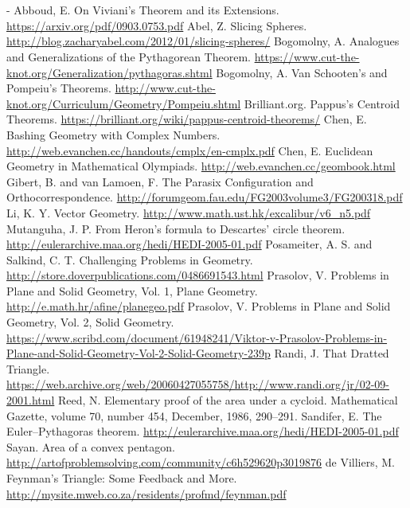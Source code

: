 \documentclass[11pt,paper=letter]{scrartcl}
\makeatletter
\renewenvironment{thebibliography}[1]
  {\par\footnotesize
   \section*{\refname}
   \@mkboth{\MakeUppercase{\refname}}{\MakeUppercase{\refname}}
   \list{\@biblabel{\arabic{enumi}}}%
        {\settowidth\labelwidth{\@biblabel{#1}}%
         \leftmargin\labelwidth
         \advance\leftmargin\labelsep
         \advance\leftmargin\bibindent
         \itemindent -\bibindent
         \listparindent \itemindent
         \parsep \z@
         \usecounter{enumi}%
         \let\p@enumi\@empty
         \renewcommand\theenumi{\arabic{enumi}}}%
     \renewcommand\newblock{\hskip .11em \@plus.33em \@minus.07em}%
     \sloppy\clubpenalty4000\widowpenalty4000%
     \frenchspacing\footnotesize}
     {\endlist}
\makeatother
\begin{document}
\begin{thebibliography}{99}
   Abboud, E. On Viviani's Theorem and its Extensions. \url{https://arxiv.org/pdf/0903.0753.pdf}
   Abel, Z. Slicing Spheres. \url{http://blog.zacharyabel.com/2012/01/slicing-spheres/}
   Bogomolny, A. Analogues and Generalizations of the Pythagorean Theorem. \url{https://www.cut-the-knot.org/Generalization/pythagoras.shtml}
   Bogomolny, A. Van Schooten's and Pompeiu's Theorems. \url{http://www.cut-the-knot.org/Curriculum/Geometry/Pompeiu.shtml}
   Brilliant.org. Pappus's Centroid Theorems. \url{https://brilliant.org/wiki/pappus-centroid-theorems/}
   Chen, E. Bashing Geometry with Complex Numbers. \url{http://web.evanchen.cc/handouts/cmplx/en-cmplx.pdf}
   Chen, E. Euclidean Geometry in Mathematical Olympiads. \url{http://web.evanchen.cc/geombook.html}
   Gibert, B. and van Lamoen, F. The Parasix Configuration and Orthocorrespondence. \url{http://forumgeom.fau.edu/FG2003volume3/FG200318.pdf}
   Li, K. Y. Vector Geometry. \url{http://www.math.ust.hk/excalibur/v6_n5.pdf}
   Mutanguha, J. P. From Heron's formula to Descartes' circle theorem. \url{http://eulerarchive.maa.org/hedi/HEDI-2005-01.pdf}
   Posameiter, A. S. and Salkind, C. T. Challenging Problems in Geometry. \url{http://store.doverpublications.com/0486691543.html}
   Prasolov, V. Problems in Plane and Solid Geometry, Vol. 1, Plane Geometry. \url{http://e.math.hr/afine/planegeo.pdf}
   Prasolov, V. Problems in Plane and Solid Geometry, Vol. 2, Solid Geometry. \url{https://www.scribd.com/document/61948241/Viktor-v-Prasolov-Problems-in-Plane-and-Solid-Geometry-Vol-2-Solid-Geometry-239p}
   Randi, J. That Dratted Triangle. \url{https://web.archive.org/web/20060427055758/http://www.randi.org/jr/02-09-2001.html}
   Reed, N. Elementary proof of the area under a cycloid. Mathematical Gazette, volume 70, number 454, December, 1986, 290–291.
   Sandifer, E. The Euler--Pythagoras theorem. \url{http://eulerarchive.maa.org/hedi/HEDI-2005-01.pdf}
   Sayan. Area of a convex pentagon. \url{http://artofproblemsolving.com/community/c6h529620p3019876}
   de Villiers, M. Feynman's Triangle: Some Feedback and More. \url{http://mysite.mweb.co.za/residents/profmd/feynman.pdf}

\end{thebibliography}
\end{document}

